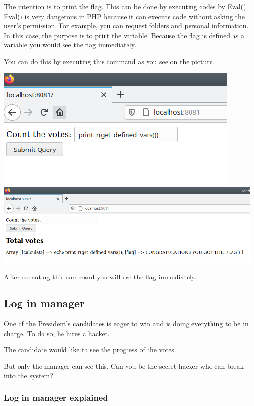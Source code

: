 \documentclass[../main.tex]{subfiles}
\begin{document}
The intention is to print the flag. This can be done by executing codes by Eval(). Eval() is very dangerous in PHP because it can execute code without asking the user's permission. For example, you can request folders and personal information. In this case, the purpose is to print the variable. Because the flag is defined as a variable you would see the flag immediately. 

You can do this by executing this command as you see on the picture.

\includegraphics[width=\linewidth]{images/Boyan/challenge1_boyan.PNG}
\includegraphics[width=\linewidth]{images/Boyan/challenge1_2_boyan.PNG}

After executing this command you will see the flag immediately. 

\subsection{Log in manager}

One of the President's candidates is eager to win and is doing everything to be in charge. To do so, he hires a hacker. 

The candidate would like to see the progress of the votes. 

But only the manager can see this. Can you be the secret hacker who can break into the system?

\subsubsection{Log in manager explained}
\end{document}
